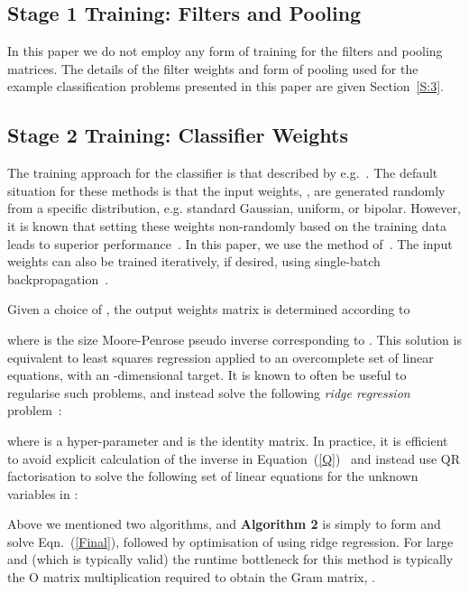 \documentclass[conference]{IEEEtran}
\begin{document}
\subsection{Stage 1 Training: Filters and Pooling}

In this paper we do not employ any form of training for the filters and pooling matrices. The details of the filter weights and form of pooling used for the example classification problems presented in this paper are given Section~\ref{S:3}.

\subsection{Stage 2 Training: Classifier Weights}

The  training approach for the classifier is that described by  e.g.~\cite{Schmidt.92,Chen.96,Eliasmith,Huang.14}. The default situation for these methods is that the input weights, , are generated randomly from a specific distribution, e.g. standard Gaussian, uniform, or bipolar. However, it is known that setting these weights non-randomly based on the training data leads to superior performance~\cite{McDonnell.15PLOS,Tapson.14,Zhu.15}. In this paper, we use the method of~\cite{Zhu.15}.  The input weights can also be trained iteratively, if desired, using single-batch  backpropagation~\cite{Yu.12}.

Given a choice of , the output weights matrix is determined according to

where  is the size  Moore-Penrose pseudo inverse corresponding to . This solution is equivalent to least squares regression applied to an overcomplete set of linear equations, with an -dimensional target.  It is known to often be useful to regularise such problems, and instead solve the following {\em ridge regression} problem~\cite{Huang.12,Huang.14}:

where  is a hyper-parameter and  is the  identity matrix. In practice, it is efficient to avoid explicit calculation of the inverse in Equation~(\ref{Q})~\cite{McDonnell.15PLOS} and instead use QR factorisation to solve the following set of  linear equations for the  unknown variables in :

Above we mentioned two algorithms, and {\bf Algorithm 2} is simply to form  and solve Eqn.~(\ref{Final}), followed by optimisation of  using ridge regression. For large  and  (which is typically valid) the runtime bottleneck for this method is typically the O matrix multiplication required to obtain the Gram matrix, .
\end{document}
